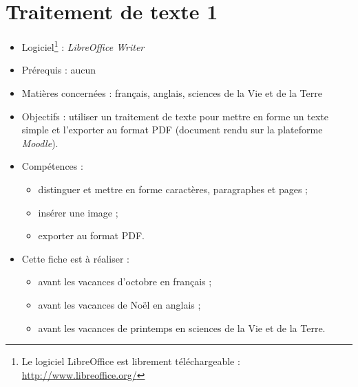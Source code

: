 \chapter{Traitement de texte 1}\label{ficheTexte1}  

\begin{itemize}
\item Logiciel\footnote{Le logiciel LibreOffice est librement téléchargeable : \url{http://www.libreoffice.org/}} : \emph{LibreOffice Writer} 
\item Prérequis : aucun
\item Matières concernées : français, anglais, sciences de la Vie et de la Terre
\item Objectifs : utiliser un traitement de texte pour mettre en forme un texte simple et l'exporter au format PDF (document rendu sur la plateforme \emph{Moodle}).
\item Compétences : 
        \begin{itemize}
        \item distinguer et mettre en forme caractères, paragraphes et pages ;
        \item insérer une image ; 
        \item exporter au format PDF.
        \end{itemize}
\item Cette fiche est à réaliser :
        \begin{itemize}
        \item avant les vacances d'octobre en français ;
        \item avant les vacances de Noël en anglais ;
        \item avant les vacances de printemps en sciences de la Vie et de la Terre. 
        \end{itemize}
\end{itemize}



